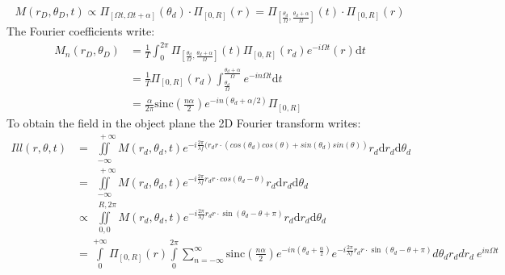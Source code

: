 \documentclass[%
reprint,
 amsmath,amssymb,
 aps,
]{revtex4-2}
\newcommand{\dd}{\mathrm{d}}
\begin{document}
\begin{equation}
    M(r_{D},\theta_{D},t) \propto \Pi_{[\Omega t,\Omega t+\alpha]}(\theta_d)\cdot\Pi_{[0,R]}(r)= \Pi_{\left[\frac{\theta_d}{\Omega},\frac{\theta_d+\alpha}{\Omega}\right]}(t)\cdot\Pi_{[0,R]}(r)
\end{equation}
The Fourier coefficients write: 
\begin{align*}
    M_n(r_{D},\theta_{D})
    &=\frac{1}{T}\int_0^{2\pi}\Pi_{\left[\frac{\theta_d}{\Omega},\frac{\theta_d+\alpha}{\Omega}\right]}(t)\Pi_{[0,R]}(r_d)e^{-i\Omega t}(r)\dd t%
    \\
    &=\frac{1}{T}\Pi_{[0,R]}(r_d)\int_{\frac{\theta_d}{\Omega}}^{\frac{\theta_d+\alpha}{\Omega}}e^{-in\Omega t}\dd t%
    \\
    &=\frac{ \alpha}{2\pi}\textrm{sinc}\left(\frac{n\alpha}{2}\right)e^{-in(\theta_d +\alpha/2)}\Pi_{[0,R]}
\end{align*}
To obtain the field in the object plane the 2D Fourier transform writes:
\begin{align}
        Ill(r,\theta,t)&=\iint \limits_{-\infty}^{\ \ \ +\infty}M(r_d,\theta_d,t)e^{-i\frac{2\pi}{\lambda f}(r_d r\cdot (cos(\theta_d)cos(\theta)+sin(\theta_d)sin(\theta))}r_d \dd r_d \dd \theta_d \\
        &=\iint \limits_{-\infty}^{\ \ \ +\infty}M(r_d,\theta_d,t)e^{-i\frac{2\pi}{\lambda f}r_d r\cdot cos(\theta_d-\theta)}r_d \dd r_d \dd\theta_d \\
        &\propto \iint \limits_{0,0}^{\ \ \ R,2\pi}M(r_d,\theta_d,t)e^{-i\frac{2\pi}{\lambda f}r_d r\cdot \sin(\theta_d-\theta+\pi)}r_d \dd r_d \dd \theta_d \\
        &=\int \limits_{0}^{+\infty}\Pi_{[0,R]}(r)\int \limits_{0}^{2\pi}\sum \limits_{n=-\infty}^{\infty} \textrm{sinc}\left(\frac{n\alpha}{2}\right)e^{-in(\theta_d +\frac{\alpha}{2})} e^{-i\frac{2\pi}{\lambda f}r_d r\cdot \sin(\theta_d-\theta+\pi)}d\theta_d r_d dr_d \ e^{in\Omega t}
\end{align}
\end{document}

